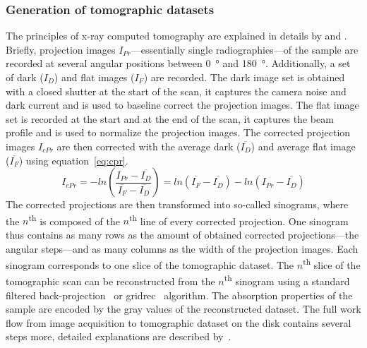 \subsubsection{Generation of tomographic datasets}
The principles of x-ray computed tomography are explained in details by \citet{Kak2002} and \citet{Hsieh2003}. Briefly, projection images $I_{Pr}$---essentially single radiographies---of the sample are recorded at several angular positions between \SI{0}{\degree} and \SI{180}{\degree}. Additionally, a set of dark ($I_{D}$) and flat images ($I_{F}$) are recorded. The dark image set is obtained with a closed shutter at the start of the scan, it captures the camera noise and dark current and is used to baseline correct the projection images. The flat image set is recorded at the start and at the end of the scan, it captures the beam profile and is used to normalize the projection images. The corrected projection images $I_{cPr}$ are then corrected with the average dark ($\overline{I_{D}}$) and average flat image ($\overline{I_{F}}$) using equation~\ref{eq:cpr}.
\begin{equation}
	I_{cPr} = -ln\left(\frac{I_{Pr}-\overline{I_{D}}}{\overline{I_{F}}-\overline{I_{D}}}\right)
	        = ln(\overline{I_{F}}-\overline{I_{D}})-ln(I_{Pr}-\overline{I_{D}})
	\label{eq:cpr}
\end{equation}
The corrected projections are then transformed into so-called sinograms, where the $n$\textsuperscript{th} is composed of the $n$\textsuperscript{th} line of every corrected projection. One sinogram thus contains as many rows as the amount of obtained corrected projections---the angular steps---and as many columns as the width of the projection images. Each sinogram corresponds to one slice of the tomographic dataset. The $n$\textsuperscript{th} slice of the tomographic scan can be reconstructed from the $n$\textsuperscript{th} sinogram using a standard filtered back-projection~\cite{Kak2002,Hsieh2003} or gridrec~\cite{Dowd1999} algorithm. The absorption properties of the sample are encoded by the gray values of the reconstructed dataset. The full work flow from image acquisition to tomographic dataset on the disk contains several steps more, detailed explanations are described by~\citet{Hintermueller2009}.

